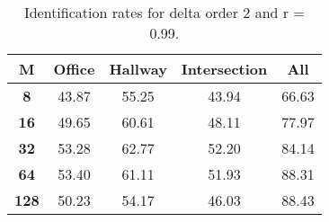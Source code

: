 \begin{table}[h]
    \small
    \centering
    \begin{tabular}{|c|c|c|c|l|}    
    \hline
    {\bf M} & {\bf Office} & {\bf Hallway} & {\bf Intersection} &     \multicolumn{1}{c|}{{\bf All}} \\ \hline
    {\bf 8} & 43.87 & 55.25 & 43.94 & 66.63 \\ \hline
    {\bf 16} & 49.65 & 60.61 & 48.11 & 77.97 \\ \hline
    {\bf 32} & 53.28 & 62.77 & 52.20 & 84.14 \\ \hline
    {\bf 64} & 53.40 & 61.11 & 51.93 & 88.31 \\ \hline
    {\bf 128} & 50.23 & 54.17 & 46.03 & 88.43 \\ \hline
    \end{tabular}
    \caption{Identification rates for delta order 2 and r = 0.99.}    
    \label{tab:identify_speakers_0.99_mit_19_2}
\end{table}
